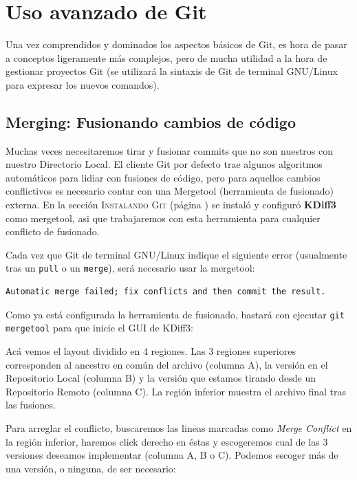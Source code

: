\documentclass{article}
\begin{document}
\pagebreak

\section{Uso avanzado de Git}\label{adv}

Una vez comprendidos y dominados los aspectos básicos de Git, es hora de pasar a conceptos ligeramente más complejos, pero de mucha utilidad a la hora de gestionar proyectos Git (se utilizará la sintaxis de Git de terminal GNU/Linux para expresar los nuevos comandos).

\subsection{Merging: Fusionando cambios de código}\label{merge}

Muchas veces necesitaremos tirar y fusionar commits que no son nuestros con nuestro Directorio Local. El cliente Git por defecto trae algunos algoritmos automáticos para lidiar con fusiones de código, pero para aquellos cambios conflictivos es necesario contar con una Mergetool (herramienta de fusionado) externa. En la sección \textsc{Instalando Git} (página \pageref{install}) se instaló y configuró \textbf{KDiff3} como mergetool, asi que trabajaremos con esta herramienta para cualquier conflicto de fusionado.

Cada vez que Git de terminal GNU/Linux indique el siguiente error (usualmente tras un \texttt{pull} o un \texttt{merge}), será necesario usar la mergetool:
\begin{verbatim}
Automatic merge failed; fix conflicts and then commit the result.
\end{verbatim}

Como ya está configurada la herramienta de fusionado, bastará con ejecutar \texttt{git mergetool} para que inicie el GUI de KDiff3\cite{mergeguys}:

Acá vemos el layout dividido en 4 regiones. Las 3 regiones superiores corresponden al ancestro en común del archivo (columna A), la versión en el Repositorio Local (columna B) y la versión que estamos tirando desde un Repositorio Remoto (columna C). La región inferior muestra el archivo final tras las fusiones.

Para arreglar el conflicto, buscaremos las lineas marcadas como \textit{Merge Conflict} en la región inferior, haremos click derecho en éstas y escogeremos cual de las 3 versiones deseamos implementar (columna A, B o C). Podemos escoger más de una versión, o ninguna, de ser necesario:
\end{document}
